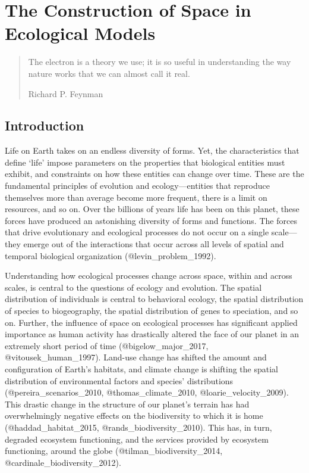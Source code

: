 \hypertarget{the-construction-of-space-in-ecological-models}{%
\section{The Construction of Space in Ecological
Models}\label{the-construction-of-space-in-ecological-models}}

\begin{quote}
The electron is a theory we use; it is so useful in understanding the
way nature works that we can almost call it real.

\begin{flushright}Richard P. Feynman\end{flushright}
\end{quote}

\hypertarget{introduction}{%
\subsection{Introduction}\label{introduction}}

Life on Earth takes on an endless diversity of forms. Yet, the
characteristics that define `life' impose parameters on the properties
that biological entities must exhibit, and constraints on how these
entities can change over time. These are the fundamental principles of
evolution and ecology---entities that reproduce themselves more than
average become more frequent, there is a limit on resources, and so on.
Over the billions of years life has been on this planet, these forces
have produced an astonishing diversity of forms and functions. The
forces that drive evolutionary and ecological processes do not occur on
a single scale---they emerge out of the interactions that occur across
all levels of spatial and temporal biological organization
(@levin\_problem\_1992).

Understanding how ecological processes change across space, within and
across scales, is central to the questions of ecology and evolution. The
spatial distribution of individuals is central to behavioral ecology,
the spatial distribution of species to biogeography, the spatial
distribution of genes to speciation, and so on. Further, the influence
of space on ecological processes has significant applied importance as
human activity has drastically altered the face of our planet in an
extremely short period of time (@bigelow\_major\_2017,
@vitousek\_human\_1997). Land-use change has shifted the amount and
configuration of Earth's habitats, and climate change is shifting the
spatial distribution of environmental factors and species' distributions
(@pereira\_scenarios\_2010, @thomas\_climate\_2010,
@loarie\_velocity\_2009). This drastic change in the structure of our
planet's terrain has had overwhelmingly negative effects on the
biodiversity to which it is home (@haddad\_habitat\_2015,
@rands\_biodiversity\_2010). This has, in turn, degraded ecosystem
functioning, and the services provided by ecosystem functioning, around
the globe (@tilman\_biodiversity\_2014, @cardinale\_biodiversity\_2012).

